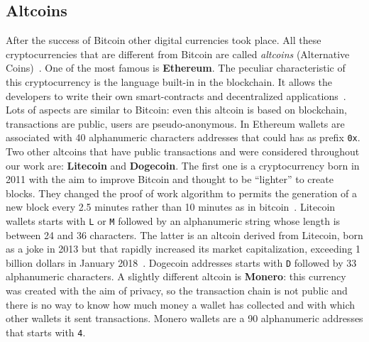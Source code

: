 \subsection{Altcoins}
After the success of Bitcoin other digital currencies took place.
All these cryptocurrencies that are different from Bitcoin are called
\emph{altcoins} (Alternative Coins)~\cite{bitcoinbeyond}.
One of the most famous is
\textbf{Ethereum}. The peculiar characteristic of this cryptocurrency is
the language built-in in the blockchain. It allows the developers to
write their own smart-contracts and decentralized
applications~\cite{bib:ethereum:whitepaper}.
Lots of aspects are similar to Bitcoin: even
this altcoin is based on blockchain, transactions are public, users are
pseudo-anonymous. In Ethereum wallets are associated with 40
alphanumeric characters addresses that could has as prefix \texttt{0x}.
Two other altcoins that have public transactions and were considered
throughout our work are: \textbf{Litecoin} and \textbf{Dogecoin}.
The first one is a cryptocurrency born in 2011 with the aim to improve
Bitcoin and thought to be ``lighter'' to create blocks.
They changed the proof of work algorithm to permits the
generation of a new block every 2.5 minutes rather than 10 minutes as in
bitcoin~\cite{bib:litecoin:wiki}.
Litecoin wallets starts with \texttt{L} or \texttt{M} followed by an
alphanumeric string whose length is between 24 and 36 characters.
The latter is an altcoin derived from Litecoin, born as a joke in 2013
but that rapidly increased its market capitalization, exceeding 1
billion dollars in January 2018~\cite{}. Dogecoin addresses
starts with \texttt{D} followed by 33 alphanumeric characters.
A slightly different altcoin is \textbf{Monero}: this currency was
created with the aim of privacy, so the transaction chain is not public
and there is no way to know how much money a wallet has collected and
with which other wallets it sent transactions.
Monero wallets are a 90 alphanumeric addresses that starts with
\texttt{4}.


